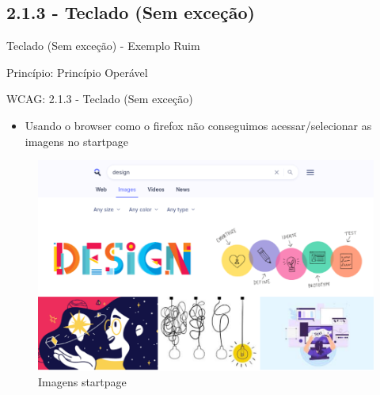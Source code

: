 \documentclass{beamer}
\begin{document}
\subsection{2.1.3 - Teclado (Sem exceção)}

\begin{frame}{Teclado (Sem exceção) - Exemplo Ruim}

Princípio: Princípio Operável

WCAG: 2.1.3 - Teclado (Sem exceção)

\begin{itemize}
	\item Usando o browser como o firefox não conseguimos acessar/selecionar as imagens no startpage
\end{itemize}
\begin{figure}
    \centering
    \includegraphics[scale=0.2]{images/no_keyboard.png}
    \caption{Imagens startpage}
\end{figure}

\end{frame}
\end{document}
